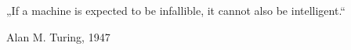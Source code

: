 
\thispagestyle{empty}

\vspace*{\fill}

\begin{center}
    \begin{minipage}{0.78\textwidth}
        \centering
        \Large\itshape

        „If a machine is expected to be infallible,
        it cannot also be intelligent.“

        \vspace{1.2cm}

        \normalsize\normalfont
        Alan M. Turing, 1947
    \end{minipage}
\end{center}

\vspace*{\fill}